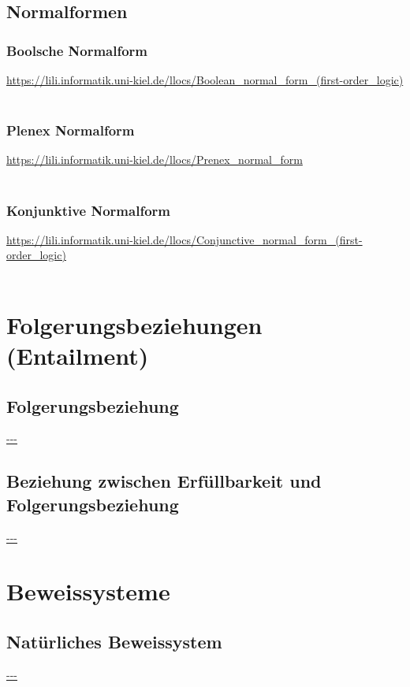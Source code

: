 \documentclass[twocolumn]{article}
\begin{document}
    \subsection{Normalformen}

    \subsubsection{Boolsche Normalform}
    \url{https://lili.informatik.uni-kiel.de/llocs/Boolean_normal_form_(first-order_logic)}\\\\

    \subsubsection{Plenex Normalform}
    \url{https://lili.informatik.uni-kiel.de/llocs/Prenex_normal_form}\\\\

    \subsubsection{Konjunktive Normalform}
    \url{https://lili.informatik.uni-kiel.de/llocs/Conjunctive_normal_form_(first-order_logic)}\\\\

    \section{Folgerungsbeziehungen (Entailment)}

    \subsection{Folgerungsbeziehung}
    \url{---}\\

    \subsection{Beziehung zwischen Erfüllbarkeit und Folgerungsbeziehung}
    \url{---}\\

    \section{Beweissysteme}

    \subsection{Natürliches Beweissystem}
    \url{---}\\
\end{document}
